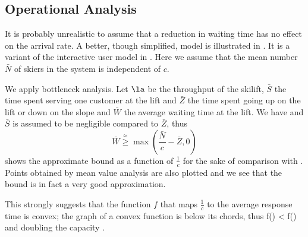 \subsection{Operational Analysis}
\begin{figure}[!htbp]
\begin{center}

\end{center}
\end{figure}
It is probably unrealistic to assume that a reduction in
waiting time has no effect on the arrival rate. A better,
though simplified, model is illustrated in .
It is a variant of the interactive user model in
. Here we assume that the mean number $\bar{N}$
of skiers in the system is independent of $c$.

We apply bottleneck analysis. Let $\la$ be the
throughput of the skilift, $\bar{S}$ the time
spent serving one customer at the lift and
$\bar{Z}$ the time spent going up on the lift or
down on the slope and $\bar{W}$ the average
waiting time at the lift. We have \ben{}
\een and $\bar{S}$ is assumed to be negligible
compared to $\bar{Z}$, thus
$$
\bar{W} \stackrel{\approx}{\geq}
\max\left(\frac{\bar{N}}{c}-\bar{Z},0\right)
$$
 shows the approximate bound as
a function of $\frac{1}{c}$ for the sake of
comparison with . Points
obtained by mean value analysis are also plotted
and we see that the bound is in fact a very good
approximation.

This strongly suggests that the function $f$ that
maps $\frac{1}{c}$ to the average response time
is convex; the graph of a convex function is
below its chords, thus
 \ben f() <  f() \een and
   doubling
 the capacity .

